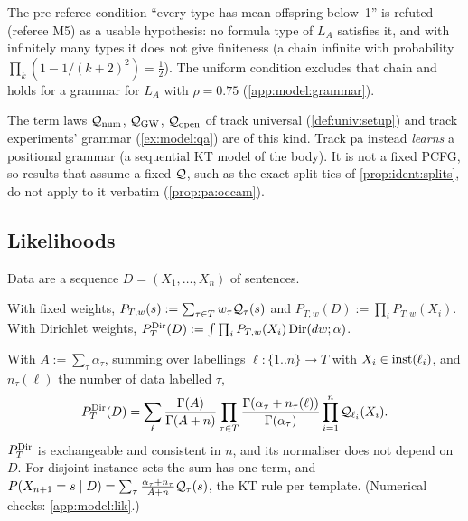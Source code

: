 \begin{remark}\label{rem:model:subcrit}
The pre-referee condition ``every type has mean offspring below~1'' is refuted (referee M5) as a usable hypothesis: no formula type of $L_A$ satisfies it, and with infinitely many types it does not give finiteness (a chain infinite with probability $\prod_k(1-1/(k+2)^2)=\tfrac12$). The uniform condition excludes that chain and holds for a grammar for $L_A$ with $\rho=0.75$ (\cref{app:model:grammar}).
\end{remark}

The term laws $\mathcal{Q}_{\mathrm{num}}$, $\mathcal{Q}_{\mathrm{GW}}$, $\mathcal{Q}_{\mathrm{open}}$ of track universal (\cref{def:univ:setup}) and track experiments' grammar (\cref{ex:model:qa}) are of this kind. Track pa instead \emph{learns} a positional grammar (a sequential KT model of the body). It is not a fixed PCFG, so results that assume a fixed $\mathcal{Q}$, such as the exact split ties of \cref{prop:ident:splits}, do not apply to it verbatim (\cref{prop:pa:occam}).

\subsection{Likelihoods}\label{sec:model:lik}

Data are a sequence $D=(X_1,\dots,X_n)$ of sentences.

\begin{definition}\label{def:model:lzero}
With fixed weights, $P_{T,w}(s):=\sum_{\tau\in T}w_\tau\mathcal{Q}_\tau(s)$ and $P_{T,w}(D):=\prod_iP_{T,w}(X_i)$. With Dirichlet weights, $P^{\mathrm{Dir}}_{T}(D):=\int\prod_iP_{T,w}(X_i)\,\mathrm{Dir}(dw;\alpha)$.
\end{definition}

\begin{lemma}\label{lem:model:dirsum}
With $A:=\sum_\tau\alpha_\tau$, summing over labellings $\ell:\{1..n\}\to T$ with $X_i\in\mathrm{inst}(\ell_i)$, and $n_\tau(\ell)$ the number of data labelled $\tau$,
\[
P^{\mathrm{Dir}}_{T}(D)=\sum_{\ell}\frac{\Gamma(A)}{\Gamma(A+n)}\prod_{\tau\in T}\frac{\Gamma(\alpha_\tau+n_\tau(\ell))}{\Gamma(\alpha_\tau)}\prod_{i=1}^n\mathcal{Q}_{\ell_i}(X_i).
\]
$P^{\mathrm{Dir}}_{T}$ is exchangeable and consistent in $n$, and its normaliser does not depend on $D$. For disjoint instance sets the sum has one term, and $P(X_{n+1}=s\mid D)=\sum_\tau\frac{\alpha_\tau+n_\tau}{A+n}\mathcal{Q}_\tau(s)$, the KT rule per template. (Numerical checks: \cref{app:model:lik}.)
\end{lemma}

